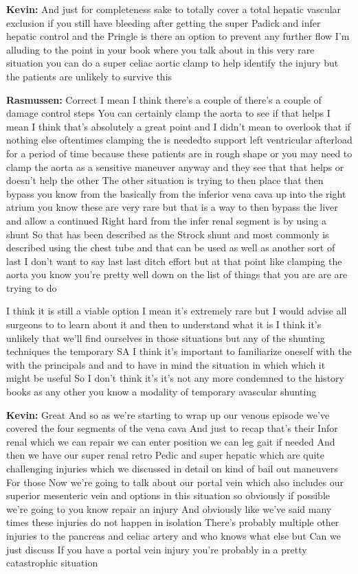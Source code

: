 \documentclass[
]{book}
\begin{document}
\textbf{Kevin:} And just for completeness sake to totally cover a total hepatic vascular exclusion if you still have bleeding after getting the super Padick and infer hepatic control and the Pringle is there an option to prevent any further flow I'm alluding to the point in your book where you talk about in this very rare situation you can do a super celiac aortic clamp to help identify the injury but the patients are unlikely to survive this

\textbf{Rasmussen:} Correct I mean I think there's a couple of there's a couple of damage control steps You can certainly clamp the aorta to see if that helps I mean I think that's absolutely a great point and I didn't mean to overlook that if nothing else oftentimes clamping the is neededto support left ventricular afterload for a period of time because these patients are in rough shape or you may need to clamp the aorta as a sensitive maneuver anyway and they see that that helps or doesn't help the other The other situation is trying to then place that then bypass you know from the basically from the inferior vena cava up into the right atrium you know these are very rare but that is a way to then bypass the liver and allow a continued Right hard from the infer renal segment is by using a shunt So that has been described as the Strock shunt and most commonly is described using the chest tube and that can be used as well as another sort of last I don't want to say last last ditch effort but at that point like clamping the aorta you know you're pretty well down on the list of things that you are are are trying to do

I think it is still a viable option I mean it's extremely rare but I would advise all surgeons to to learn about it and then to understand what it is I think it's unlikely that we'll find ourselves in those situations but any of the shunting techniques the temporary SA I think it's important to familiarize oneself with the with the principals and and to have in mind the situation in which which it might be useful So I don't think it's it's not any more condemned to the history books as any other you know a modality of temporary avascular shunting

\textbf{Kevin:} Great And so as we're starting to wrap up our venous episode we've covered the four segments of the vena cava And just to recap that's their Infor renal which we can repair we can enter position we can leg gait if needed And then we have our super renal retro Pedic and super hepatic which are quite challenging injuries which we discussed in detail on kind of bail out maneuvers For those Now we're going to talk about our portal vein which also includes our superior mesenteric vein and options in this situation so obviously if possible we're going to you know repair an injury And obviously like we've said many times these injuries do not happen in isolation There's probably multiple other injuries to the pancreas and celiac artery and who knows what else but Can we just discuss If you have a portal vein injury you're probably in a pretty catastrophic situation
\end{document}
